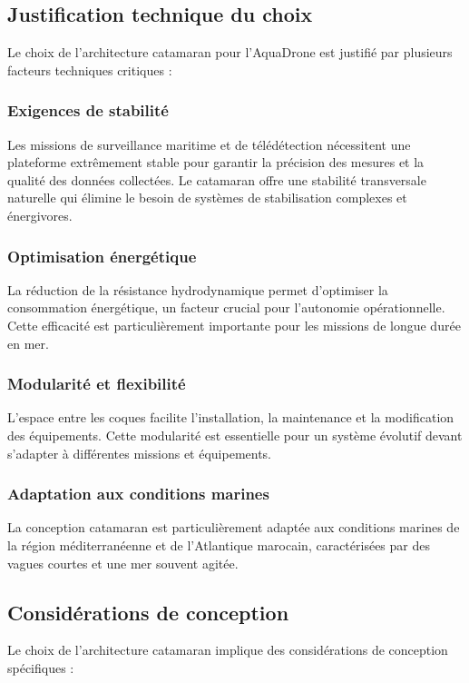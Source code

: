 {\subsection{Justification technique du choix}
Le choix de l'architecture catamaran pour l'AquaDrone est justifié par plusieurs facteurs techniques critiques :

\subsubsection{Exigences de stabilité}
Les missions de surveillance maritime et de télédétection nécessitent une plateforme extrêmement stable pour garantir la précision des mesures et la qualité des données collectées. Le catamaran offre une stabilité transversale naturelle qui élimine le besoin de systèmes de stabilisation complexes et énergivores.

\subsubsection{Optimisation énergétique}
La réduction de la résistance hydrodynamique permet d'optimiser la consommation énergétique, un facteur crucial pour l'autonomie opérationnelle. Cette efficacité est particulièrement importante pour les missions de longue durée en mer.

\subsubsection{Modularité et flexibilité}
L'espace entre les coques facilite l'installation, la maintenance et la modification des équipements. Cette modularité est essentielle pour un système évolutif devant s'adapter à différentes missions et équipements.

\subsubsection{Adaptation aux conditions marines}
La conception catamaran est particulièrement adaptée aux conditions marines de la région méditerranéenne et de l'Atlantique marocain, caractérisées par des vagues courtes et une mer souvent agitée.

\subsection{Considérations de conception}
Le choix de l'architecture catamaran implique des considérations de conception spécifiques :

}
